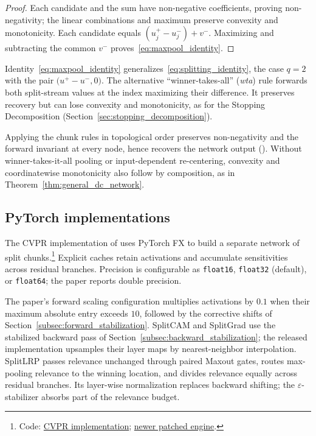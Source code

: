 \begin{proof}
Each candidate and the sum have non-negative coefficients, proving non-negativity; the linear combinations and maximum preserve convexity and monotonicity. Each candidate equals $(u_j^+-u_j^-)+v^-$. Maximizing and subtracting the common $v^-$ proves~\eqref{eq:maxpool_identity}.
\end{proof}

Identity~\eqref{eq:maxpool_identity} generalizes~\eqref{eq:splitting_identity}, the case $q = 2$ with the pair $\bigl( u^+ - u^-, 0 \bigr)$. The alternative ``winner-takes-all'' (\emph{wta}) rule forwards both split-stream values at the index maximizing their difference. It preserves recovery but can lose convexity and monotonicity, as for the Stopping Decomposition (Section~\ref{sec:stopping_decomposition}).

Applying the chunk rules in topological order preserves non-negativity and the forward invariant at every node, hence recovers the network output (). Without winner-takes-it-all pooling or input-dependent re-centering, convexity and coordinatewise monotonicity also follow by composition, as in Theorem~\ref{thm:general_dc_network}.

\subsection{PyTorch implementations}\label{subsec:split_implementations}

The CVPR implementation of \textcite{hiddenMono} uses PyTorch FX to build a separate network of split chunks.\footnote{Code: \href{https://github.com/JayPiZimmermann/DC-Decomposition-for-Explanability}{CVPR implementation}; \href{https://github.com/JayPiZimmermann/Playing_The_Network_Backward_Official_Repository}{newer patched engine}.} Explicit caches retain activations and accumulate sensitivities across residual branches. Precision is configurable as \texttt{float16}, \texttt{float32} (default), or \texttt{float64}; the paper reports double precision.

The paper's forward scaling configuration multiplies activations by $0.1$ when their maximum absolute entry exceeds $10$, followed by the corrective shifts of Section~\ref{subsec:forward_stabilization}. SplitCAM and SplitGrad use the stabilized backward pass of Section~\ref{subsec:backward_stabilization}; the released implementation upsamples their layer maps by nearest-neighbor interpolation. SplitLRP passes relevance unchanged through paired Maxout gates, routes max-pooling relevance to the winning location, and divides relevance equally across residual branches. Its layer-wise normalization replaces backward shifting; the $\varepsilon$-stabilizer absorbs part of the relevance budget.

